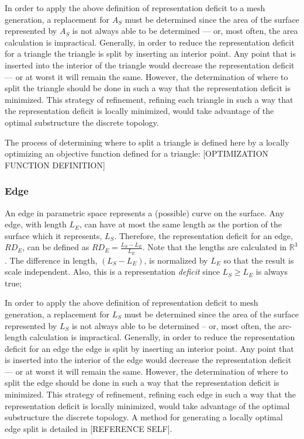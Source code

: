 \documentclass[11pt]{article}
\begin{document}
In order to apply the above definition of representation deficit to a
mesh generation, a replacement for $A_S$ must be determined since the
area of the surface represented by $A_S$ is not always able to be
determined --- or, most often, the area calculation is impractical.
Generally, in order to reduce the representation deficit for a triangle
the triangle is split by inserting an interior point. Any point that is
inserted into the interior of the triangle would decrease the
representation deficit --- or at worst it will remain the same. However,
the determination of where to split the triangle should be done in such
a way that the representation deficit is minimized. This strategy of
refinement, refining each triangle in such a way that the representation
deficit is locally minimized,  would take advantage of the optimal
substructure the discrete topology.

The process of determining where to split a triangle is defined here by
a locally optimizing an objective function defined for a triangle:
[OPTIMIZATION FUNCTION DEFINITION]

\subsubsection{Edge}
An edge in parametric space represents a (possible) curve on the
surface. Any edge, with length $L_E$, can have at most the same length
as the portion of the surface which it represents, $L_S$. Therefore, the
representation deficit for an edge, $RD_E$, can be defined as $RD_E =
\frac{L_S - L_E}{L_E}$. Note that the lengths are calculated in
${\mathbb R}^3$. The difference in length, $\left(L_S - L_E\right)$, is
normalized by $L_E$ so that the result is scale independent. Also, this
is a representation {\it deficit} since $L_S \ge L_E$ is always true;

In order to apply the above definition of representation deficit to mesh
generation, a replacement for $L_S$ must be determined since the area of
the surface represented by $L_S$ is not always able to be determined --
or, most often, the arc-length calculation is impractical.
Generally, in order to reduce the representation deficit for an edge 
the edge is split by inserting an interior point. Any point that is
inserted into the interior of the edge would decrease the
representation deficit --- or at worst it will remain the same. However,
the determination of where to split the edge should be done in such
a way that the representation deficit is minimized. This strategy of
refinement, refining each edge in such a way that the representation
deficit is locally minimized,  would take advantage of the optimal
substructure the discrete topology. A method for generating a locally
optimal edge split is detailed in [REFERENCE SELF].
\end{document}
